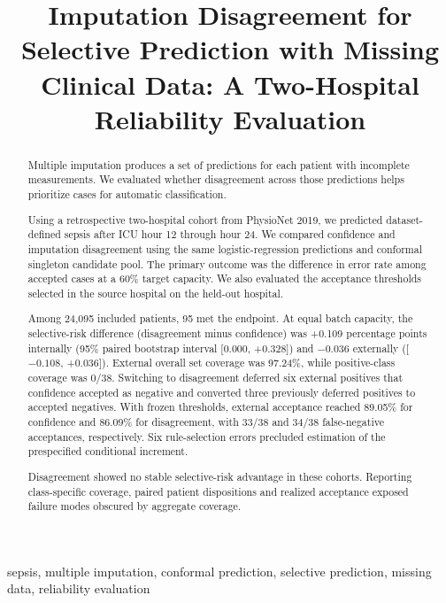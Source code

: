 \documentclass[conference]{IEEEtran}
\begin{document}
\title{Imputation Disagreement for Selective Prediction with Missing Clinical Data: A Two-Hospital Reliability Evaluation}

\author{
}

\maketitle

\begin{abstract}
Multiple imputation produces a set of predictions for each patient with incomplete measurements. We evaluated whether disagreement across those predictions helps prioritize cases for automatic classification.

Using a retrospective two-hospital cohort from PhysioNet 2019, we predicted dataset-defined sepsis after ICU hour 12 through hour 24. We compared confidence and imputation disagreement using the same logistic-regression predictions and conformal singleton candidate pool. The primary outcome was the difference in error rate among accepted cases at a 60\% target capacity. We also evaluated the acceptance thresholds selected in the source hospital on the held-out hospital.

Among 24,095 included patients, 95 met the endpoint. At equal batch capacity, the selective-risk difference (disagreement minus confidence) was +0.109 percentage points internally (95\% paired bootstrap interval [0.000, +0.328]) and $-0.036$ externally ([$-0.108$, +0.036]). External overall set coverage was 97.24\%, while positive-class coverage was 0/38. Switching to disagreement deferred six external positives that confidence accepted as negative and converted three previously deferred positives to accepted negatives. With frozen thresholds, external acceptance reached 89.05\% for confidence and 86.09\% for disagreement, with 33/38 and 34/38 false-negative acceptances, respectively. Six rule-selection errors precluded estimation of the prespecified conditional increment.

Disagreement showed no stable selective-risk advantage in these cohorts. Reporting class-specific coverage, paired patient dispositions and realized acceptance exposed failure modes obscured by aggregate coverage.
\end{abstract}

\begin{IEEEkeywords}
sepsis, multiple imputation, conformal prediction, selective prediction, missing data, reliability evaluation
\end{IEEEkeywords}





\end{document}
